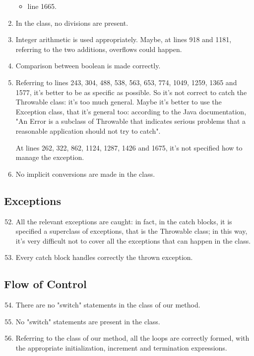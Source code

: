 \begin{enumerate}
\begin{itemize}
	        \item line 1665. 
	    \end{itemize}
	\item In the class, no divisions are present.
	\item Integer arithmetic is used appropriately. Maybe, at lines 918 and 1181, referring to the two additions, overflows could happen.
	\item Comparison between boolean is made correctly.
	\item Referring to lines 243, 304, 488, 538, 563, 653, 774, 1049, 1259, 1365 and 1577, it's better to be as specific as possible. So it's not correct to catch the Throwable class: it's too much general. Maybe it's better to use the Exception class, that it's general too: according to the Java documentation, "An Error is a subclass of Throwable that indicates serious problems that a reasonable application should not try to catch". 
	
    At lines 262, 322, 862, 1124, 1287, 1426 and 1675, it's not specified how to manage the exception.
	\item No implicit conversions are made in the class.
\end{enumerate}
\subsection{Exceptions}
\begin{enumerate}
	\setcounter{enumi}{51}
	\item All the relevant exceptions are caught: in fact, in the catch blocks, it is specified a superclass of exceptions, that is the Throwable class; in this way, it's very difficult not to cover all the exceptions that can happen in the class.
	\item Every catch block handles correctly the thrown exception.
\end{enumerate}
\subsection{Flow of Control}
\begin{enumerate}
	\setcounter{enumi}{53}
	\item There are no "switch" statements in the class of our method.
	\item No "switch" statements are present in the class.
	\item Referring to the class of our method, all the loops are correctly formed, with the appropriate initialization, increment and termination expressions.
\end{enumerate}
